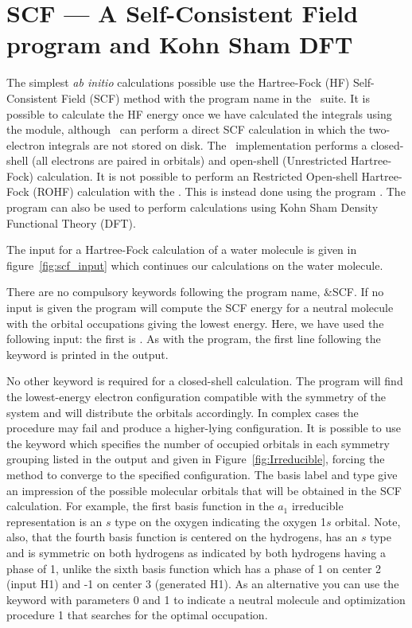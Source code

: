 \section{SCF --- A Self-Consistent Field program and Kohn Sham DFT}
\label{TUT:sec:scf}
The simplest {\em ab initio} calculations possible use the Hartree-Fock
(HF) Self-Consistent Field (SCF) method with the program name  in 
the \molcas\ suite.  It is possible to calculate the HF energy once we have 
calculated the integrals using the  module, although \molcas\
can perform a direct SCF calculation in which the two-electron integrals are
not stored on disk. The \molcas\ implementation performs a closed-shell (all 
electrons are paired in orbitals) and open-shell (Unrestricted Hartree-Fock) 
calculation. It is not possible to perform an Restricted Open-shell Hartree-Fock (ROHF)
calculation with the . This is instead done using the program
\program{RASSCF}. The \program{SCF} program can also be used to perform
calculations using Kohn Sham Density Functional Theory (DFT). 

The  input for a Hartree-Fock calculation of a water
molecule is given in figure~\ref{fig:scf_input}
which continues our calculations on the water molecule.

There are no compulsory keywords following the program name, \&SCF. If no input
is given the program will compute the SCF energy for a neutral molecule with the
orbital occupations giving the lowest energy. Here, we have used the following
input:  the first is \keyword{TITLe}. As 
with the  program, the first line following the keyword is 
printed in the output.


No other keyword is required for a closed-shell calculation. The program
will find the lowest-energy electron configuration compatible with the
symmetry of the system and will distribute the orbitals accordingly.
In complex cases the procedure may fail and produce a higher-lying configuration.
It is possible to use the keyword \keyword{OCCUpied}
which specifies the number of occupied orbitals in each symmetry grouping
listed in the \program{GATEWAY} output and given in
Figure~\ref{fig:Irreducible}, forcing the method to converge to the specified
configuration. The basis label and type give an
impression of the possible molecular orbitals that will be obtained in
the SCF calculation.  For example, the first basis function in the $a_1$
irreducible representation is an $s$ type on the oxygen indicating the
oxygen 1$s$ orbital. Note, also, that the fourth basis  function is centered on
the hydrogens, has an $s$ type and is symmetric on both hydrogens as
indicated by both hydrogens having a phase of 1, unlike the sixth basis function
which has a phase of 1 on center 2 (input H1) and -1 on center 3
(generated H1).
As an alternative you can use the keyword  with parameters 0 and
1 to indicate a neutral molecule and optimization procedure 1 that searches for
the optimal occupation.

